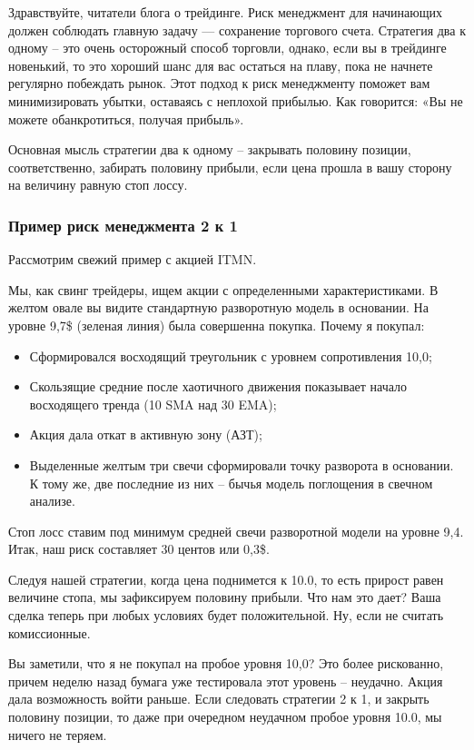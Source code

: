 \documentclass{book}
\begin{document}
Здравствуйте, читатели блога о трейдинге. Риск менеджмент для начинающих должен соблюдать главную задачу — сохранение торгового счета. Стратегия два к одному – это очень осторожный способ торговли, однако, если вы в трейдинге новенький, то это хороший шанс для вас остаться на плаву, пока не начнете регулярно побеждать рынок. Этот подход к риск менеджменту поможет вам минимизировать убытки, оставаясь с неплохой прибылью. Как говорится: «Вы не можете обанкротиться, получая прибыль».

Основная мысль стратегии два к одному – закрывать половину позиции,
соответственно, забирать половину прибыли, если цена прошла в вашу
сторону на величину равную стоп лоссу.

\subsubsection{Пример риск менеджмента 2 к 1}

Рассмотрим свежий пример с акцией ITMN.

Мы, как свинг трейдеры, ищем акции с определенными характеристиками. В желтом овале вы видите стандартную разворотную модель в основании. На уровне 9,7\$ (зеленая линия) была совершенна покупка. Почему я покупал:
\begin{itemize}
\item     Сформировался восходящий треугольник с уровнем сопротивления 10,0;
\item     Скользящие средние после хаотичного движения показывает начало восходящего тренда (10 SMA над 30 EMA);
\item     Акция дала откат в активную зону (АЗТ);
\item     Выделенные желтым три свечи сформировали точку разворота в основании. К тому же, две последние из них – бычья модель поглощения в свечном анализе.
\end{itemize}

Стоп лосс ставим под минимум средней свечи разворотной модели на уровне 9,4. Итак, наш риск составляет 30 центов или 0,3\$.

Следуя нашей стратегии, когда цена поднимется к 10.0, то есть прирост равен величине стопа, мы зафиксируем половину прибыли. Что нам это дает? Ваша сделка теперь при любых условиях будет положительной. Ну, если не считать комиссионные.

Вы заметили, что я не покупал на пробое уровня 10,0? Это более рискованно, причем неделю назад бумага уже тестировала этот уровень – неудачно. Акция дала возможность войти раньше. Если следовать стратегии 2 к 1, и закрыть половину позиции, то даже при очередном неудачном пробое уровня 10.0, мы ничего не теряем.
\end{document}
